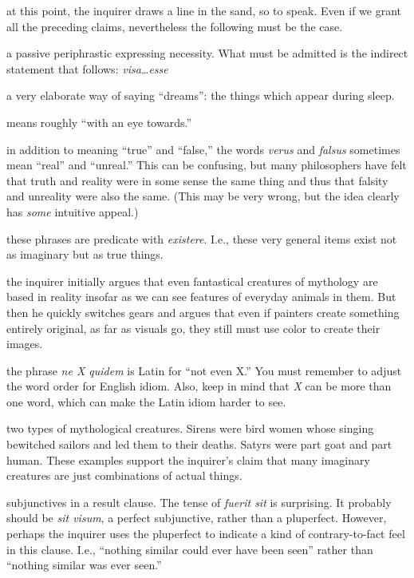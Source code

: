  at this point, the inquirer draws a line in the sand, so to speak. Even if we grant all the preceding claims, nevertheless the following must be the case.

 a passive periphrastic expressing necessity. What must be admitted is the indirect statement that follows: \textit{visa\dots esse}

 a very elaborate way of saying ``dreams'': the things which appear during sleep.

 means roughly ``with an eye towards.''

 in addition to meaning ``true'' and ``false,'' the words \textit{verus} and \textit{falsus} sometimes mean ``real'' and ``unreal.'' This can be confusing, but many philosophers have felt that truth and reality were in some sense the same thing and thus that falsity and unreality were also the same. (This may be very wrong, but the idea clearly has \textit{some} intuitive appeal.)

 these phrases are predicate with \textit{existere}. I.e., these very general items exist not as imaginary but as true things.

 the inquirer initially argues that even fantastical creatures of mythology are based in reality insofar as we can see features of everyday animals in them. But then he quickly switches gears and argues that even if painters create something entirely original, as far as visuals go, they still must use color to create their images.

 the phrase \textit{ne X quidem} is Latin for ``not even X.'' You must remember to adjust the word order for English idiom. Also, keep in mind that \textit{X} can be more than one word, which can make the Latin idiom harder to see.

 two types of mythological creatures. Sirens were bird women whose singing bewitched sailors and led them to their deaths. Satyrs were part goat and part human. These examples support the inquirer's claim that many imaginary creatures are just combinations of actual things.

 subjunctives in a result clause. The tense of \textit{fuerit sit} is surprising. It probably should be \textit{sit visum}, a perfect subjunctive, rather than a pluperfect. However, perhaps the inquirer uses the pluperfect to indicate a kind of contrary-to-fact feel in this clause. I.e., ``nothing similar could ever have been seen'' rather than ``nothing similar was ever seen.''


